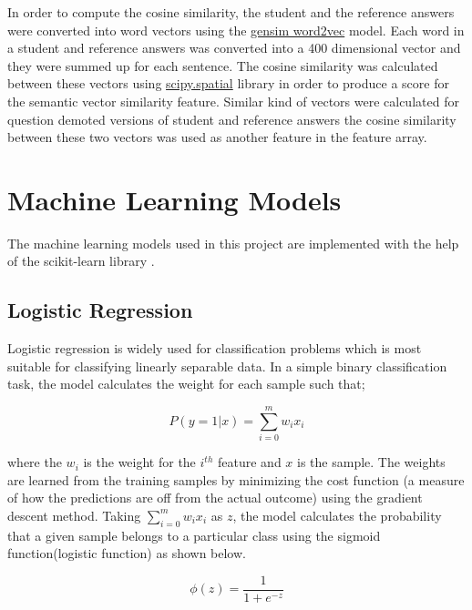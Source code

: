 	In order to compute the cosine similarity, the student and the reference answers were converted into word vectors using the \href{https://radimrehurek.com/gensim/models/word2vec.html}{gensim word2vec} model. Each word in a student and reference answers was converted into a 400 dimensional vector and they were summed up for each sentence. The cosine similarity was calculated between these vectors using \href{https://docs.scipy.org/doc/scipy/reference/generated/scipy.spatial.distance.cosine.html}{scipy.spatial} library in order to produce a score for the semantic vector similarity feature. Similar kind of vectors were calculated for question demoted versions of student and reference answers the cosine similarity between these two vectors was used as another feature in the feature array.
    
    \section{Machine Learning Models \cite{raschka2015python}} 
    
    The machine learning models used in this project are implemented with the help of the scikit-learn library \cite{scikit_learn}.
    
    \subsection{Logistic Regression}
    
    Logistic regression is widely used for classification problems which is most suitable for classifying linearly separable data. In a simple binary classification task, the model calculates the weight for each sample such that;
    
    \begin{equation}  
    P(y=1|x) = \sum_{i=0}^{m} w_i x_i
    \end{equation} 
    
    where the $w_i$ is the weight for the $i^{th}$ feature and $x$ is the sample. The weights are learned from the training samples by minimizing the cost function (a measure of how the predictions are off from the actual outcome) using the gradient descent method. Taking $\sum_{i=0}^{m} w_i x_i$ as $z$, the model calculates the probability that a given sample belongs to a particular class using the sigmoid function(logistic function) as shown below.  
    
    \begin{equation}  
    \phi(z) = \frac{1}{1+e^{-z}} 
    \end{equation} 
    
